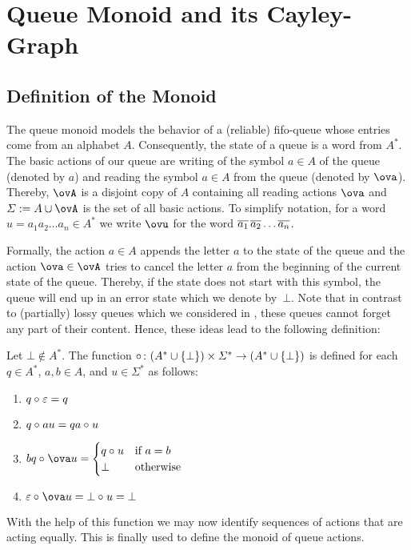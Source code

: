 \section{Queue Monoid and its Cayley-Graph}
\subsection{Definition of the Monoid}
The queue monoid models the behavior of a (reliable) fifo-queue whose entries come from an alphabet $A$. Consequently, the state of a queue is a word from $A^*$. The basic actions of our queue are writing of the symbol $a\in A$ of the queue (denoted by $a$) and reading the symbol $a\in A$ from the queue (denoted by $\ova$). Thereby, $\ovA$ is a disjoint copy of $A$ containing all reading actions $\ova$ and $\varSigma:=A\cup\ovA$ is the set of all basic actions. To simplify notation, for a word $u=a_1a_2\dots a_n\in A^*$ we write $\ovu$ for the word $\overline{a_1}\,\overline{a_2}\dots \overline{a_n}$.

Formally, the action $a\in A$ appends the letter $a$ to the state of the queue and the action $\ova\in\ovA$ tries to cancel the letter $a$ from the beginning of the current state of the queue. Thereby, if the state does not start with this symbol, the queue will end up in an error state which we denote by~$\bot$. Note that in contrast to (partially) lossy queues which we considered in \cite{KKP18,Koe18}, these queues cannot forget any part of their content. Hence, these ideas lead to the following definition:

\begin{definition}
	Let $\bot\notin A^*$. The function $\circ_{}\colon(A^*\cup\{\bot\})\times\varSigma^*\to(A^*\cup\{\bot\})$ is defined for each $q\in A^*$, $a,b\in A$, and $u\in\varSigma^*$ as follows:
	\begin{enumerate}[(1)]
		\item $q\circ_{} \varepsilon=q$
		\item $q\circ_{} au=qa\circ_{} u$
		\item $bq\opx \ova u=\begin{cases}
			q\opx u & \text{if }a=b\\
			\bot & \text{otherwise}
		\end{cases}$
		\item $\varepsilon\opx \ova u=\bot\opx u=\bot$
	\end{enumerate}
\end{definition}

With the help of this function we may now identify sequences of actions that are acting equally. This is finally used to define the monoid of queue actions.

